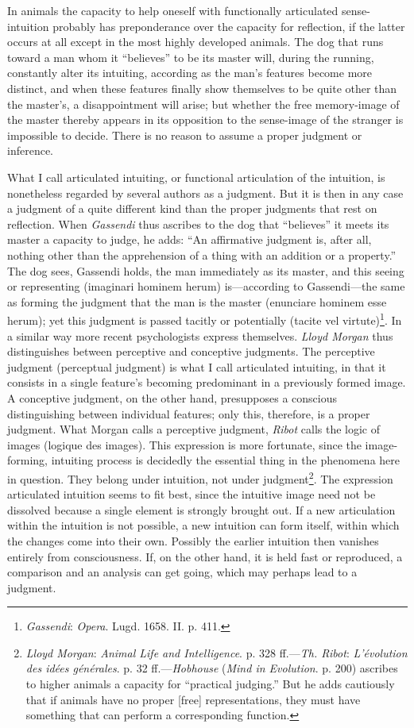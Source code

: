 \documentclass[12pt,a4paper]{book}
\newcommand{\opage}[1]{\marginnote{\footnotesize\textit{[#1]}}}
\begin{document}
In animals the capacity to help oneself with functionally articulated
sense-intuition probably has preponderance over the capacity for
reflection, if the latter occurs at all except in the most highly
developed animals. The dog that runs toward a man whom it ``believes'' to
be its master will, during the \opage{55}running, constantly alter its intuiting,
according as the man's features become more distinct, and when these
features finally show themselves to be quite other than the master's, a
disappointment will arise; but whether the free memory-image of the master
thereby appears in its opposition to the sense-image of the stranger is
impossible to decide. There is no reason to assume a proper judgment or
inference.

What I call articulated intuiting, or functional articulation of the
intuition, is nonetheless regarded by several authors as a judgment. But
it is then in any case a judgment of a quite different kind than the
proper judgments that rest on reflection. When \emph{Gassendi} thus
ascribes to the dog that ``believes'' it meets its master a capacity to
judge, he adds: ``An affirmative judgment is, after all, nothing other
than the apprehension of a thing with an addition or a property.'' The dog
sees, Gassendi holds, the man immediately as its master, and this seeing
or representing (imaginari hominem herum) is---according to
Gassendi---the same as forming the judgment that the man is the master
(enunciare hominem esse herum); yet this judgment is passed tacitly or
potentially (tacite vel virtute)\footnote{\emph{Gassendi}: \emph{Opera}.
Lugd. 1658. II. p. 411.}. In a similar way more recent psychologists express
themselves. \emph{Lloyd Morgan} thus distinguishes between perceptive and
conceptive judgments. The perceptive judgment (perceptual judgment) is
what I call articulated intuiting, in that it consists in a single
feature's becoming predominant in a previously formed image. A conceptive
judgment, on the other hand, presupposes a conscious distinguishing
between individual features; only this, therefore, is a proper judgment.
What Morgan calls a perceptive judgment, \emph{Ribot} calls the logic of
images (logique des images). This expression is more fortunate, since the
image-forming, intuiting process is decidedly the essential thing in the
phenomena here in question. They belong under intuition, not under
judgment\footnote{\emph{Lloyd Morgan}: \emph{Animal Life and
Intelligence}. p. 328 ff.---\emph{Th. Ribot}: \emph{L'évolution des idées
générales}. p. 32 ff.---\emph{Hobhouse} (\emph{Mind in Evolution}. p.
200) ascribes to higher animals a capacity for ``practical judging.'' But
he adds cautiously that if animals have no proper [free] representations,
they must have something that can perform a corresponding function.}. The
expression articulated intuition seems to fit best, since the intuitive
image \opage{56}need not be dissolved because a single element is strongly brought
out. If a new articulation within the intuition is not possible, a new
intuition can form itself, within which the changes come into their own.
Possibly the earlier intuition then vanishes entirely from consciousness.
If, on the other hand, it is held fast or reproduced, a comparison and an
analysis can get going, which may perhaps lead to a judgment.
\end{document}

